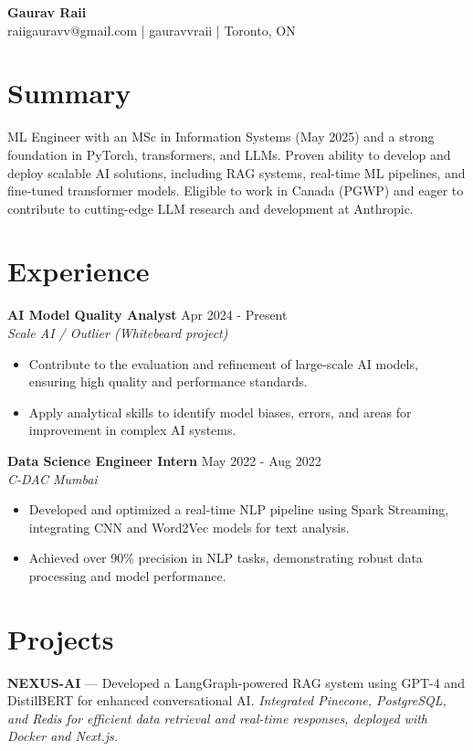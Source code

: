 \documentclass[10.5pt,letterpaper]{article}
\begin{document}
\begin{center}
  {\LARGE\textbf{Gaurav Raii}} \\[4pt]
  raiigauravv@gmail.com | gauravvraii | Toronto, ON
\end{center}

\section{Summary}
ML Engineer with an MSc in Information Systems (May 2025) and a strong foundation in PyTorch, transformers, and LLMs. Proven ability to develop and deploy scalable AI solutions, including RAG systems, real-time ML pipelines, and fine-tuned transformer models. Eligible to work in Canada (PGWP) and eager to contribute to cutting-edge LLM research and development at Anthropic.

\section{Experience}

\textbf{AI Model Quality Analyst} \hfill Apr 2024 - Present \\
\textit{Scale AI / Outlier (Whitebeard project)}
\begin{itemize}
  \item Contribute to the evaluation and refinement of large-scale AI models, ensuring high quality and performance standards.
  \item Apply analytical skills to identify model biases, errors, and areas for improvement in complex AI systems.
\end{itemize}


\textbf{Data Science Engineer Intern} \hfill May 2022 - Aug 2022 \\
\textit{C-DAC Mumbai}
\begin{itemize}
  \item Developed and optimized a real-time NLP pipeline using Spark Streaming, integrating CNN and Word2Vec models for text analysis.
  \item Achieved over 90\% precision in NLP tasks, demonstrating robust data processing and model performance.
\end{itemize}


\section{Projects}
\textbf{NEXUS-AI} — Developed a LangGraph-powered RAG system using GPT-4 and DistilBERT for enhanced conversational AI. \textit{Integrated Pinecone, PostgreSQL, and Redis for efficient data retrieval and real-time responses, deployed with Docker and Next.js.}
\end{document}
